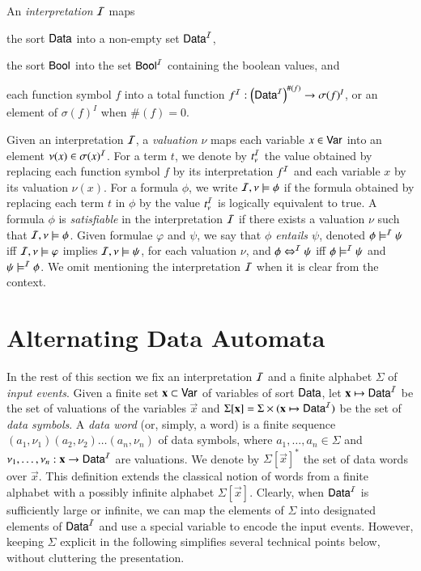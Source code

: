 \documentclass{llncs}
\begin{document}
An \emph{interpretation} $\mathcal{I}$ maps\begin{inparaenum}[(1)]
\item the sort $\mathsf{Data}$ into a non-empty set $\mathsf{Data}^{\mathcal{I}}$, 
%
\item the sort $\mathsf{Bool}$ into the set $\mathsf{Bool}^{\mathcal{I}}$ containing the boolean
  values, and
%
\item each function symbol $f$ into a total function $f^{\mathcal{I}} :
  \left(\mathsf{Data}^{\mathcal{I}}\right)^{\#(f)} \rightarrow \sigma(f)^I$, or an element of
  $\sigma(f)^I$ when $\#(f)=0$.
\end{inparaenum}
Given an interpretation $\mathcal{I}$, a \emph{valuation} $\nu$ maps each
variable $x \in \mathsf{Var}$ into an element $\nu(x) \in \sigma(x)^{\mathcal{I}}$. For
a term $t$, we denote by $t^{\mathcal{I}}_\nu$ the value obtained by replacing
each function symbol $f$ by its interpretation $f^{\mathcal{I}}$ and each
variable $x$ by its valuation $\nu(x)$. For a formula $\phi$, we write
$\mathcal{I},\nu \models \phi$ if the formula obtained by replacing each term
$t$ in $\phi$ by the value $t^{\mathcal{I}}_\nu$ is logically equivalent to true.
A formula $\phi$ is \emph{satisfiable} in the interpretation $\mathcal{I}$ if
there exists a valuation $\nu$ such that $\mathcal{I},\nu \models \phi$. Given
formulae $\varphi$ and $\psi$, we say that \emph{$\phi$ entails
  $\psi$}, denoted $\phi \models^{\mathcal{I}} \psi$ iff $\mathcal{I},\nu \models \varphi$
implies $\mathcal{I},\nu \models \psi$, for each valuation $\nu$, and $\phi
\Leftrightarrow^{\mathcal{I}} \psi$ iff $\phi \models^{\mathcal{I}} \psi$ and $\psi \models^{\mathcal{I}} \phi$.
We omit mentioning the interpretation $\mathcal{I}$ when it is clear from the
context.

\section{Alternating Data Automata}

In the rest of this section we fix an interpretation $\mathcal{I}$ and a finite
alphabet $\Sigma$ of \emph{input events}. Given a finite set $\mathbf x
\subset \mathsf{Var}$ of variables of sort $\mathsf{Data}$, let $\mathbf x \mapsto
\mathsf{Data}^{\mathcal{I}}$ be the set of valuations of the variables $\vec{x}$ and
$\Sigma[\mathbf x] = \Sigma \times (\mathbf x \mapsto \mathsf{Data}^{\mathcal{I}})$ be the
set of \emph{data symbols}. A \emph{data word} (or, simply, a word) is
a finite sequence $(a_1,\nu_1)(a_2,\nu_2) \ldots (a_n,\nu_n)$ of data
symbols, where $a_1,\ldots,a_n \in \Sigma$ and $\nu_1,\ldots,\nu_n :
\mathbf x \rightarrow \mathsf{Data}^{\mathcal{I}}$ are valuations. We denote by
$\Sigma[\vec{x}]^*$ the set of data words over $\vec{x}$. This
definition extends the classical notion of words from a finite
alphabet with a possibly infinite alphabet $\Sigma[\vec{x}]$. Clearly,
when $\mathsf{Data}^{\mathcal{I}}$ is sufficiently large or infinite, we can map the
elements of $\Sigma$ into designated elements of $\mathsf{Data}^{\mathcal{I}}$ and use a
special variable to encode the input events. However, keeping $\Sigma$
explicit in the following simplifies several technical points below,
without cluttering the presentation.
\end{document}
